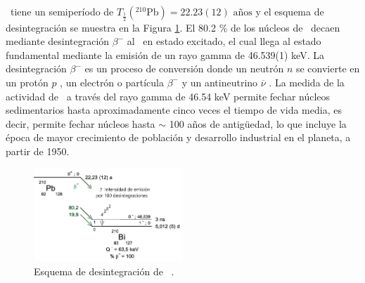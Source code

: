\\
\\
\PbCero\, tiene un semiperíodo de $T_{\frac{1}{2}}(^{210}\text{Pb}) = 22.23(12)\text{ años}$ \cite{DataDecayEvaluation} y el esquema de desintegración se muestra en la Figura \ref{Fig-Squema210Pb}. El 80.2 \% de los núcleos de \PbCero\, decaen mediante desintegración $\beta^{-}$ al \Bi\, en estado excitado, el cual llega al estado fundamental mediante la emisión de un rayo gamma de 46.539(1) keV. La desintegración $\beta^{-}$ es un proceso de conversión donde un neutrón $n$ se convierte en un protón $p$	, un electrón o partícula $\beta^{-}$ y un antineutrino $\overline{\nu}$ \cite{gilmore2008}. La medida de la actividad de \PbCero\, a través del rayo gamma de 46.54 keV permite fechar núcleos sedimentarios hasta aproximadamente cinco veces el tiempo de vida media, es decir, permite fechar núcleos hasta $\sim$ 100 años de antig\"uedad, lo que incluye la época de mayor crecimiento de población y desarrollo industrial en el planeta, a partir de 1950. 
\begin{figure}[h]
\centering
\includegraphics[width=0.5\textwidth]{Imagenes/210Pb-2.png}
\caption{Esquema de desintegración de \PbCero\, \cite{DataDecayEvaluation}.}\label{Fig-Squema210Pb}
\end{figure}

